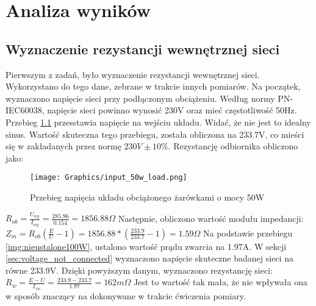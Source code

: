 \chapter{Analiza wyników}
\label{cha:analysis}


\section{Wyznaczenie rezystancji wewnętrznej sieci}
\label{sec:resistance_in}
Pierwszym z zadań, było wyznaczenie rezystancji wewnętrznej sieci. Wykorzystano do tego dane, zebrane w trakcie innych pomiarów.
\newline Na początek, wyznaczono napięcie sieci przy podłączonym obciążeniu. Według normy PN-IEC60038, napięcie sieci powinno wynosić 230V oraz mieć częstotliwość 50Hz. Przebieg \ref{img:input_load_50_sch} przesstawia napięcie na wejściu układu. Widać, że nie jest to idealny sinus. Wartość skuteczna tego przebiegu, została obliczona na 233.7V, co mieści się w zakładanych przez normę $230V\pm 10\%$. Rezystancję odbiornika obliczono jako:
\newline

\begin{figure}[H]
    \centering
    \texttt{[image: Graphics/input\_50w\_load.png]}
    \caption{Przebieg napięcia układu obciążonego żarówkami o mocy 50W}
    \label{img:input_load_50_sch}
\end{figure}
$ R_{ob} = \frac{U_{wy}}{I_{wy}} = \frac{285.96}{0.154} =  1856.88 \Omega$
\newline Następnie, obliczono wartość modułu impedancji: \newline
$ Z_m = R_{ob}(\frac{E}{U} - 1) = 1856.88 * (\frac{233.9}{233.7} - 1) = 1.59\Omega $
\newline Na podstawie przebiegu \ref{img:nieustalone100W}, ustalono wartość prądu zwarcia na 1.97A. W sekcji \ref{sec:voltage_not_connected} wyznaczono napięcie skuteczne badanej sieci na równe 233.9V. Dzięki powyższym danym, wyznaczono rezystancję sieci:\newline
$R_w = \frac{E - U}{I_{zw}} = \frac{233.9 - 233.7}{1.97} = 162m\Omega $
\newline Jest to wartość tak mała, że nie wpływała ona w sposób znaczący na dokonywane w trakcie ćwiczenia pomiary.


